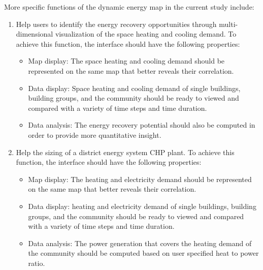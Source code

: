 More specific functions of the dynamic energy map in the current study
include:
\begin{enumerate}[1).]
  
\item Help users to identify the energy recovery opportunities
  through multi-dimensional visualization of the space heating and
  cooling demand. To achieve this function, the interface should have
  the following properties:
  \begin{itemize}
  \item Map display: The space heating and cooling demand should
    be represented on the same map that better reveals their
    correlation.
  \item Data display: Space heating and cooling demand of single
    buildings, building groups, and the community should be ready to
    viewed and compared with a variety of time steps and time
    duration.
  \item Data analysis: The energy recovery potential should also be
    computed in order to provide more quantitative insight.
  \end{itemize}

\item Help the sizing of a district energy system CHP plant. To
  achieve this function, the interface should have the following
  properties:
  \begin{itemize}
  \item Map display: The heating and electricity demand should
    be represented on the same map that better reveals their
    correlation.
  \item Data display: heating and electricity demand of single
    buildings, building groups, and the community should be ready to
    viewed and compared with a variety of time steps and time
    duration.
  \item Data analysis: The power generation that covers the heating
    demand of the community should be computed based on user specified
    heat to power ratio.
  \end{itemize}
\end{enumerate}